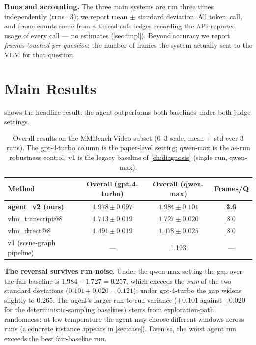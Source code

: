 \textbf{Runs and accounting.} The three main systems are run three times
independently (runs=3); we report mean $\pm$ standard deviation. All token, call,
and frame counts come from a thread-safe ledger recording the API-reported usage of
every call --- no estimates (\cref{sec:impl}). Beyond accuracy we report
\emph{frames-touched per question}: the number of frames the system actually sent
to the VLM for that question.

\section{Main Results}
\label{sec:main-results}

 shows the headline result: the agent outperforms both baselines
under both judge settings.

\begin{table}[t]
  \centering
  \small
  \caption{Overall results on the MMBench-Video subset (0--3 scale, mean $\pm$ std
  over 3 runs). The gpt-4-turbo column is the paper-level setting; qwen-max is the
  as-run robustness control. v1 is the legacy baseline of \cref{ch:diagnosis}
  (single run, qwen-max).}
  \label{tab:main}
  \begin{tabular}{@{}lccc@{}}
    \toprule
    Method & Overall (gpt-4-turbo) & Overall (qwen-max) & Frames/Q \\
    \midrule
    \textbf{agent\_v2 (ours)} & $\mathbf{1.978 \pm 0.097}$ & $\mathbf{1.984 \pm 0.101}$ & \textbf{3.6} \\
    vlm\_transcript@8 & $1.713 \pm 0.019$ & $1.727 \pm 0.020$ & 8.0 \\
    vlm\_direct@8 & $1.491 \pm 0.019$ & $1.478 \pm 0.025$ & 8.0 \\
    v1 (scene-graph pipeline) & --- & 1.193 & --- \\
    \bottomrule
  \end{tabular}
\end{table}

\textbf{The reversal survives run noise.} Under the qwen-max setting the gap over
the fair baseline is $1.984 - 1.727 = 0.257$, which exceeds the \emph{sum} of the
two standard deviations ($0.101 + 0.020 = 0.121$); under gpt-4-turbo the gap widens
slightly to $0.265$. The agent's larger run-to-run variance ($\pm 0.101$ against
$\pm 0.020$ for the deterministic-sampling baselines) stems from exploration-path
randomness: at low temperature the agent may choose different windows across runs
(a concrete instance appears in \cref{sec:case}). Even so, the worst agent run
exceeds the best fair-baseline run.

